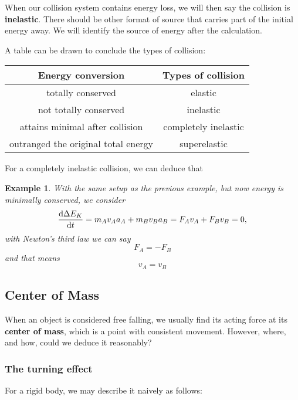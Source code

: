 \documentclass[12pt]{article}
\newtheorem*{example}{Example}
\begin{document}
    When our collision system contains energy loss, we will then say the collision is \textbf{inelastic}. There should be other format of source that carries part of the initial energy away. We will identify the source of energy after the calculation.

    A table can be drawn to conclude the types of collision:

    \begin{center}
        \begin{tabular}{|c|c|}
            \hline
            Energy conversion&Types of collision\\
            \hline
            totally conserved&elastic\\
            \hline
            not totally conserved&inelastic\\
            \hline
            attains minimal after collision&completely inelastic\\
            \hline
            outranged the original total energy&superelastic\\
            \hline
        \end{tabular}
    \end{center}

    For a completely inelastic collision, we can deduce that

    \begin{example}
        With the same setup as the previous example, but now energy is minimally conserved, we consider \[\derivative{\Delta E_K}{t}=m_A v_A a_A+m_B v_B a_B = F_A v_A + F_B v_B = 0,\] with Newton's third law we can say \[F_A = -F_B\] and that means \[v_A = v_B\]
    \end{example}

    \subsection{Center of Mass}

    When an object is considered free falling, we usually find its acting force at its \textbf{center of mass}, which is a point with consistent movement. However, where, and how, could we deduce it reasonably?

    \subsubsection*{The turning effect}

    For a rigid body, we may describe it naively as follows:
\end{document}
